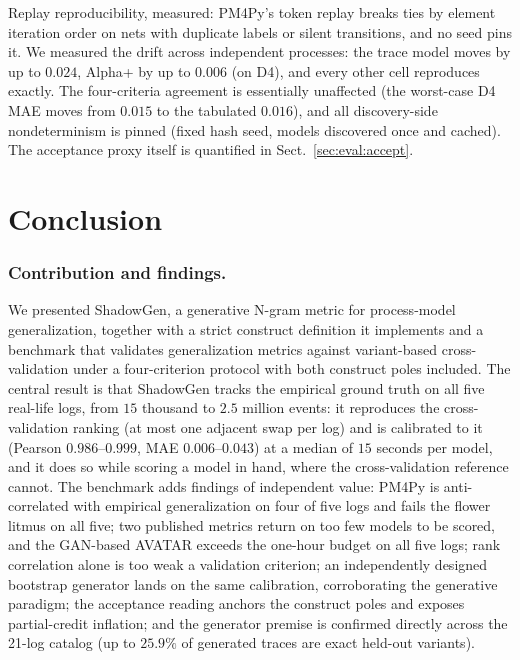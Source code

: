 \documentclass[runningheads]{llncs}
\newcommand{\chg}[1]{\textcolor{chgblue}{#1}}
\begin{document}
\chg{Replay reproducibility, measured: PM4Py's token replay breaks ties by element iteration order on nets with duplicate labels or silent transitions, and no seed pins it. We measured the drift across independent processes: the trace model moves by up to $0.024$, Alpha+ by up to $0.006$ (on D4), and every other cell reproduces exactly. The four-criteria agreement is essentially unaffected (the worst-case D4 MAE moves from $0.015$ to the tabulated $0.016$), and all discovery-side nondeterminism is pinned (fixed hash seed, models discovered once and cached). The acceptance proxy itself is quantified in Sect.~\ref{sec:eval:accept}.}

\section{Conclusion}
\label{sec:conclusion}

\subsubsection{Contribution and findings.}
We presented ShadowGen, a generative N-gram metric for process-model generalization, together with a strict construct definition it implements and a benchmark that validates generalization metrics against variant-based cross-validation under a four-criterion protocol with both construct poles included. \chg{The central result is that ShadowGen tracks the empirical ground truth on all five real-life logs, from $15$ thousand to $2.5$ million events: it reproduces the cross-validation ranking (at most one adjacent swap per log) and is calibrated to it (Pearson $0.986$--$0.999$, MAE $0.006$--$0.043$) at a median of $15$ seconds per model, and it does so while scoring a model in hand, where the cross-validation reference cannot. The benchmark adds findings of independent value: PM4Py is anti-correlated with empirical generalization on four of five logs and fails the flower litmus on all five; two published metrics return on too few models to be scored, and the GAN-based AVATAR exceeds the one-hour budget on all five logs; rank correlation alone is too weak a validation criterion; an independently designed bootstrap generator lands on the same calibration, corroborating the generative paradigm; the acceptance reading anchors the construct poles and exposes partial-credit inflation; and the generator premise is confirmed directly across the 21-log catalog (up to $25.9\%$ of generated traces are exact held-out variants).}
\end{document}
